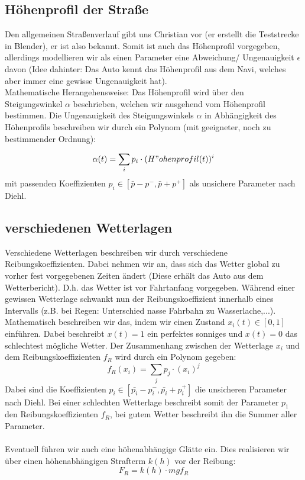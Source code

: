 \documentclass[12pt,a4paper]{article}
\theoremstyle{definition}
\theoremstyle{plain}
\begin{document}
\subsection{Höhenprofil der Straße}
Den allgemeinen Straßenverlauf gibt uns Christian vor (er erstellt die Teststrecke in Blender), er ist also bekannt. Somit ist auch das Höhenprofil vorgegeben, allerdings modellieren wir als einen Parameter eine Abweichung/ Ungenauigkeit $\epsilon$ davon (Idee dahinter: Das Auto kennt das Höhenprofil aus dem Navi, welches aber immer eine gewisse Ungenauigkeit hat).\\
Mathematische Herangehensweise: Das Höhenprofil wird über den Steigungswinkel $\alpha$ beschrieben, welchen wir ausgehend vom Höhenprofil bestimmen. Die Ungenauigkeit des Steigungswinkels $\alpha$ in Abhängigkeit des Höhenprofils
beschreiben wir durch ein Polynom (mit geeigneter, noch zu bestimmender Ordnung):

$$ \alpha(t)=\sum_{i} p_{i}\cdot(H"ohenprofil(t))^{i}$$
mit passenden Koeffizienten $p_{i}\in [\bar{p}-p^{-}, \bar{p}+p^{+}]$ als unsichere Parameter nach Diehl.

\subsection{verschiedenen Wetterlagen}
Verschiedene Wetterlagen beschreiben wir durch verschiedene Reibungskoeffizienten. Dabei nehmen wir an, dass sich das Wetter global zu vorher fest vorgegebenen Zeiten ändert (Diese erhält das Auto aus dem Wetterbericht). D.h. das Wetter ist vor Fahrtanfang vorgegeben. Während einer gewissen Wetterlage schwankt nun der Reibungskoeffizient innerhalb eines Intervalls (z.B. bei Regen: Unterschied nasse Fahrbahn zu Wasserlache,...).\\
Mathematisch beschreiben wir das, indem wir einen Zustand $x_{i}(t)\in [0,1]$ einführen. Dabei beschreibt $x(t)=1$ ein perfektes sonniges und $x(t)=0$ das schlechtest mögliche Wetter. Der Zusammenhang zwischen der Wetterlage $x_{i}$ und dem Reibungskoeffizienten $f_{R}$ wird durch ein Polynom gegeben:
$$f_{R}(x_{i})=\sum_{j} p_{j}\cdot (x_{i})^{j} $$
Dabei sind die Koeffizienten $p_{i}\in [\bar{p_{i}}-p^{-}_{i},\bar{p_{i}}+p^{+}_{i}]$ die unsicheren Parameter nach Diehl. Bei einer schlechten Wetterlage beschreibt somit der Parameter $p_{1}$ den Reibungskoeffizienten $f_{R}$, bei gutem Wetter beschreibt ihn die Summer aller Parameter.\\
\\
Eventuell führen wir auch eine höhenabhängige Glätte ein. Dies realisieren wir über einen höhenabhängigen Strafterm $k(h)$ vor der Reibung:
$$ F_{R}= k(h)\cdot mgf_{R}$$
\end{document}
